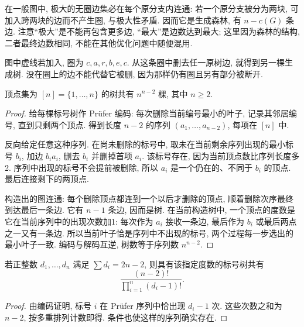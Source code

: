 在一般图中, 极大的无圈边集必在每个原分支内连通: 若一个原分支被分为两块, 可加入跨两块的边而不产生圈, 与极大性矛盾. 因而它是生成森林, 有 $n-c(G)$ 条边. 注意“极大”是不能再包含更多边, “最大”是边数达到最大; 这里因为森林的结构, 二者最终边数相同, 不能在其他优化问题中随便混用.
\begin{center}
\end{center}
图中虚线若加入, 圈为 $c,a,r,b,e,c$. 从这条圈中删去任一原树边, 就得到另一棵生成树. 没在圈上的边不能代替它被删, 因为那样仍有圈且另有部分被断开.
\begin{theorem}[Cayley 公式]\label{thm:cayley}
顶点集为 $[n]=\{1,\ldots,n\}$ 的树共有 $n^{n-2}$ 棵, 其中 $n\ge2$.
\end{theorem}
\begin{proof}
给每棵标号树作 Prüfer 编码: 每次删除当前编号最小的叶子, 记录其邻居编号, 直到只剩两个顶点. 得到长度 $n-2$ 的序列 $(a_1,\ldots,a_{n-2})$, 每项在 $[n]$ 中.

反向给定任意这种序列. 在尚未删除的标号中, 取未在当前剩余序列出现的最小标号 $b_i$, 加边 $b_i a_i$, 删去 $b_i$ 并删掉首项 $a_i$. 该标号存在, 因为当前顶点数比序列长度多2. 序列中出现的标号不会提前被删除, 所以 $a_i$ 是一个仍在的、不同于 $b_i$ 的顶点. 最后连接剩下的两顶点.

构造出的图连通: 每个删除顶点都连到一个以后才删除的顶点, 顺着删除次序最终到达最后一条边. 它有 $n-1$ 条边, 因而是树. 在当前构造树中, 一个顶点的度数是它在当前序列中的出现次数加1: 每次作为 $a_i$ 接收一条边, 最后作为 $b_i$ 或最后两点之一又有一条边. 所以当前叶子恰是序列中不出现的标号, 两个过程每一步选出的最小叶子一致. 编码与解码互逆, 树数等于序列数 $n^{n-2}$.
\end{proof}
\begin{corollary}
若正整数 $d_1,\ldots,d_n$ 满足 $\sum d_i=2n-2$, 则具有该指定度数的标号树共有
\[
\frac{(n-2)!}{\prod_{i=1}^n(d_i-1)!}.
\]
\end{corollary}
\begin{proof}
由编码证明, 标号 $i$ 在 Prüfer 序列中恰出现 $d_i-1$ 次. 这些次数之和为 $n-2$, 按多重排列计数即得. 条件也使这样的序列确实存在.
\end{proof}
